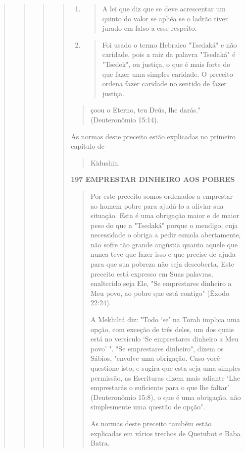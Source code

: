 \begin{quote}
\begin{quote}
\begin{quote}
\begin{quote}
\begin{enumerate}
\def\labelenumi{\arabic{enumi}.}
\setcounter{enumi}{198}
\item
 \begin{quote}
 A lei que diz que se deve acrescentar um quinto do valor se apliéa se
 o ladrão tiver jurado em falso a esse respeito.
 \end{quote}
\item
 \begin{quote}
 Foi usado o termo Hebraico "Tsedaká" e não caridade, pois a raiz da
 palavra "Tsedaká" é "Tsedek", ou justiça, o que é mais forte do que
 fazer uma simples caridade. O preceito ordena fazer caridade no
 sentido de fazer justiça.
 \end{quote}
\end{enumerate}

\begin{quote}çoou o Eterno, teu Deús, lhe darás."(Deuteronômio 15:14).
\end{quote}

As normas deste preceito estão explicadas no primeiro capítulo de

\begin{quote}
Kidushin.
\end{quote}

\textbf{197 EMPRESTAR DINHEIRO AOS POBRES}

\begin{quote}
Por este preceito somos ordenados a emprestar ao homem pobre para
ajudá-lo a aliviar sua situação. Esta é uma obrigação maior e de maior
peso do que a "Tsedaká" porque o mendigo, cuja necessidade o obriga a
pedir es­mola abertamente, não sofre tão grande angústia quanto aquele
que nunca teve que fazer isso e que precise de ajuda para que sua
pobreza não seja descoberta. Este preceito está expresso em Suas
palavras, enaltecido seja Ele, "Se empresta­res dinheiro a Meu povo, ao
pobre que está contigo" (Êxodo 22:24).

A Mekhiltá diz: "Todo `se' na Torah implica uma opção, com exce­ção de
três deles, um dos quais está no versículo `Se emprestares dinheiro a
Meu povo' ". "Se emprestares dinheiro", dizem os Sábios, "envolve uma
obri­gação. Caso você questione isto, e sugira que esta seja uma simples
permissão, as Escrituras dizem mais adiante `Lhe emprestarás o
suficiente para o que lhe faltar' (Deuteronômio 15:8), o que é uma
obrigação, não simplesmente uma ques­tão de opção".

As normas deste preceito também estão explicadas em vários trechos de
Quetubot e Baba Batra.


\end{quote}
\end{quote}
\end{quote}
\end{quote}
\end{quote}
